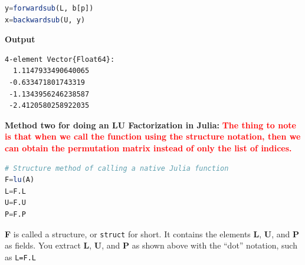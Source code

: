 \begin{itemize}
\begin{lstlisting}[language=Julia,style=mystyle]
y=forwardsub(L, b[p])
x=backwardsub(U, y)
\end{lstlisting}
\textbf{Output}
\begin{verbatim}
4-element Vector{Float64}:
  1.1147933490640065
 -0.633471801743319
 -1.1343956246238587
 -2.4120580258922035
\end{verbatim}
\textbf{Method two for doing an LU Factorization in Julia:} \textcolor{red}{\bf The thing to note is that when we call the function using the structure notation, then we can obtain the permutation matrix instead of only the list of indices.}
\begin{lstlisting}[language=Julia,style=mystyle]
# Structure method of calling a native Julia function
F=lu(A)
L=F.L
U=F.U 
P=F.P
\end{lstlisting}
\textbf{F} is called a structure, or \texttt{struct} for short. It contains the elements \textbf{L}, \textbf{U}, and \textbf{P} as fields. You extract \textbf{L}, \textbf{U}, and \textbf{P} as shown above with the ``dot'' notation, such as \texttt{L=F.L}\\


\end{itemize}
